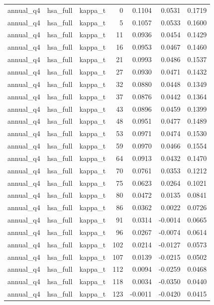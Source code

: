 \begin{tabular}{lllrrrr}
annual\_q4 & hsa\_full & kappa\_t & 0 & 0.1104 & 0.0531 & 0.1719 \\
annual\_q4 & hsa\_full & kappa\_t & 5 & 0.1057 & 0.0533 & 0.1600 \\
annual\_q4 & hsa\_full & kappa\_t & 11 & 0.0936 & 0.0454 & 0.1429 \\
annual\_q4 & hsa\_full & kappa\_t & 16 & 0.0953 & 0.0467 & 0.1460 \\
annual\_q4 & hsa\_full & kappa\_t & 21 & 0.0993 & 0.0486 & 0.1537 \\
annual\_q4 & hsa\_full & kappa\_t & 27 & 0.0930 & 0.0471 & 0.1432 \\
annual\_q4 & hsa\_full & kappa\_t & 32 & 0.0880 & 0.0448 & 0.1349 \\
annual\_q4 & hsa\_full & kappa\_t & 37 & 0.0876 & 0.0442 & 0.1364 \\
annual\_q4 & hsa\_full & kappa\_t & 43 & 0.0896 & 0.0459 & 0.1399 \\
annual\_q4 & hsa\_full & kappa\_t & 48 & 0.0951 & 0.0477 & 0.1489 \\
annual\_q4 & hsa\_full & kappa\_t & 53 & 0.0971 & 0.0474 & 0.1530 \\
annual\_q4 & hsa\_full & kappa\_t & 59 & 0.0970 & 0.0466 & 0.1554 \\
annual\_q4 & hsa\_full & kappa\_t & 64 & 0.0913 & 0.0432 & 0.1470 \\
annual\_q4 & hsa\_full & kappa\_t & 70 & 0.0761 & 0.0353 & 0.1212 \\
annual\_q4 & hsa\_full & kappa\_t & 75 & 0.0623 & 0.0264 & 0.1021 \\
annual\_q4 & hsa\_full & kappa\_t & 80 & 0.0472 & 0.0135 & 0.0841 \\
annual\_q4 & hsa\_full & kappa\_t & 86 & 0.0362 & 0.0022 & 0.0726 \\
annual\_q4 & hsa\_full & kappa\_t & 91 & 0.0314 & -0.0014 & 0.0665 \\
annual\_q4 & hsa\_full & kappa\_t & 96 & 0.0267 & -0.0074 & 0.0614 \\
annual\_q4 & hsa\_full & kappa\_t & 102 & 0.0214 & -0.0127 & 0.0573 \\
annual\_q4 & hsa\_full & kappa\_t & 107 & 0.0139 & -0.0215 & 0.0502 \\
annual\_q4 & hsa\_full & kappa\_t & 112 & 0.0094 & -0.0259 & 0.0468 \\
annual\_q4 & hsa\_full & kappa\_t & 118 & 0.0034 & -0.0350 & 0.0440 \\
annual\_q4 & hsa\_full & kappa\_t & 123 & -0.0011 & -0.0420 & 0.0415 \\

\end{tabular}
